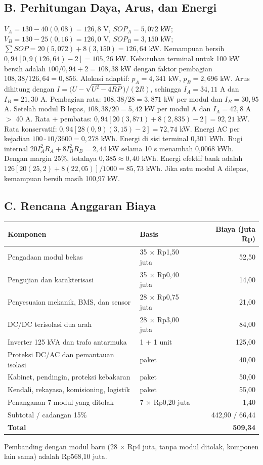 \documentclass[12pt,a4paper,twocolumn]{article}
\begin{document}
\subsection*{B. Perhitungan Daya, Arus, dan Energi}
$V_A=130-40(0{,}08)=126{,}8$ V, $SOP_A=5{,}072$ kW; $V_B=130-25(0{,}16)=126{,}0$ V, $SOP_B=3{,}150$ kW; $\sum SOP=20(5{,}072)+8(3{,}150)=126{,}64$ kW. Kemampuan bersih $0{,}94[0{,}9(126{,}64)-2]=105{,}26$ kW. Kebutuhan terminal untuk 100 kW bersih adalah $100/0{,}94+2=108{,}38$ kW dengan faktor pembagian $108{,}38/126{,}64=0{,}856$. Alokasi adaptif: $p_A=4{,}341$ kW, $p_B=2{,}696$ kW. Arus dihitung dengan $I=\big(U-\sqrt{U^2-4RP}\big)/(2R)$, sehingga $I_A=34{,}11$ A dan $I_B=21{,}30$ A. Pembagian rata: $108{,}38/28=3{,}871$ kW per modul dan $I_B=30{,}95$ A. Setelah modul B lepas, $108{,}38/20=5{,}42$ kW per modul A dan $I_A=42{,}8$ A $>$ 40 A. Rata + pembatas: $0{,}94[20(3{,}871)+8(2{,}835)-2]=92{,}21$ kW. Rata konservatif: $0{,}94[28(0{,}9)(3{,}15)-2]=72{,}74$ kW. Energi AC per kejadian $100\cdot10/3600=0{,}278$ kWh. Energi di sisi terminal 0,301 kWh. Rugi internal $20I_A^2R_A+8I_B^2R_B=2{,}44$ kW selama 10 s menambah 0,0068 kWh. Dengan margin 25\%, totalnya $0{,}385\approx0{,}40$ kWh. Energi efektif bank adalah $126[20(25{,}2)+8(22{,}05)]/1000=85{,}73$ kWh. Jika satu modul A dilepas, kemampuan bersih masih 100,97 kW.

\subsection*{C. Rencana Anggaran Biaya}
\begin{center}
\small
\begin{tabular}{|p{8.0cm}|p{5.2cm}|r|}
\hline
\textbf{Komponen} & \textbf{Basis} & \textbf{Biaya (juta Rp)} \\
\hline
Pengadaan modul bekas & 35 × Rp1,50 juta & 52,50 \\
\hline
Pengujian dan karakterisasi & 35 × Rp0,40 juta & 14,00 \\
\hline
Penyesuaian mekanik, BMS, dan sensor & 28 × Rp0,75 juta & 21,00 \\
\hline
DC/DC terisolasi dua arah & 28 × Rp3,00 juta & 84,00 \\
\hline
Inverter 125 kVA dan trafo antarmuka & 1 + 1 unit & 125,00 \\
\hline
Proteksi DC/AC dan pemantauan isolasi & paket & 40,00 \\
\hline
Kabinet, pendingin, proteksi kebakaran & paket & 50,00 \\
\hline
Kendali, rekayasa, komisioning, logistik & paket & 55,00 \\
\hline
Penanganan 7 modul yang ditolak & 7 × Rp0,20 juta & 1,40 \\
\hline
Subtotal / cadangan 15\% & & 442,90 / 66,44 \\
\hline
\textbf{Total} & & \textbf{509,34} \\
\hline
\end{tabular}
\end{center}
Pembanding dengan modul baru (28 × Rp4 juta, tanpa modul ditolak, komponen lain sama) adalah Rp568,10 juta.
\end{document}
